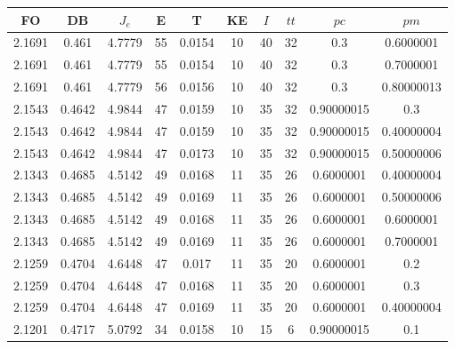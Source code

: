 \begin{table}[h!]
    \footnotesize
    \begin{center}
        \begin{tabular}{|c|c|c|c|c|c|c|c|c|c|}
        \hline
            {\bf FO} & {\bf DB} & $J_e$ & {\bf E} & {\bf T} & {\bf KE} & $I$ & $tt$ & $pc$ & $pm$ \\
        \hline
        \hline
            2.1691 & 0.461  & 4.7779 & 55 & 0.0154 & 10 & 40 & 32 & 0.3 & 0.6000001\\
        \hline
        \hline
            2.1691 & 0.461  & 4.7779 & 55 & 0.0154 & 10 & 40 & 32 & 0.3 & 0.7000001\\
        \hline
        \hline
            2.1691 & 0.461  & 4.7779 & 56 & 0.0156 & 10 & 40 & 32 & 0.3 & 0.80000013\\
        \hline
        \hline
            2.1543 & 0.4642  & 4.9844 & 47 & 0.0159 & 10 & 35 & 32 & 0.90000015 & 0.3\\
        \hline
        \hline
            2.1543 & 0.4642  & 4.9844 & 47 & 0.0159 & 10 & 35 & 32 & 0.90000015 & 0.40000004\\
        \hline
        \hline
            2.1543 & 0.4642  & 4.9844 & 47 & 0.0173 & 10 & 35 & 32 & 0.90000015 & 0.50000006\\
        \hline
        \hline
            2.1343 & 0.4685  & 4.5142 & 49 & 0.0168 & 11 & 35 & 26 & 0.6000001 & 0.40000004\\
        \hline
        \hline
            2.1343 & 0.4685  & 4.5142 & 49 & 0.0169 & 11 & 35 & 26 & 0.6000001 & 0.50000006\\
        \hline
        \hline
            2.1343 & 0.4685  & 4.5142 & 49 & 0.0168 & 11 & 35 & 26 & 0.6000001 & 0.6000001\\
        \hline
        \hline
            2.1343 & 0.4685  & 4.5142 & 49 & 0.0169 & 11 & 35 & 26 & 0.6000001 & 0.7000001\\
        \hline
        \hline
            2.1259 & 0.4704  & 4.6448 & 47 & 0.017 & 11 & 35 & 20 & 0.6000001 & 0.2\\
        \hline
        \hline
            2.1259 & 0.4704  & 4.6448 & 47 & 0.0168 & 11 & 35 & 20 & 0.6000001 & 0.3\\
        \hline
        \hline
            2.1259 & 0.4704  & 4.6448 & 47 & 0.0169 & 11 & 35 & 20 & 0.6000001 & 0.40000004\\
        \hline
        \hline
            2.1201 & 0.4717  & 5.0792 & 34 & 0.0158 & 10 & 15 & 6 & 0.90000015 & 0.1\\

\end{tabular}
\end{center}
\end{table}

